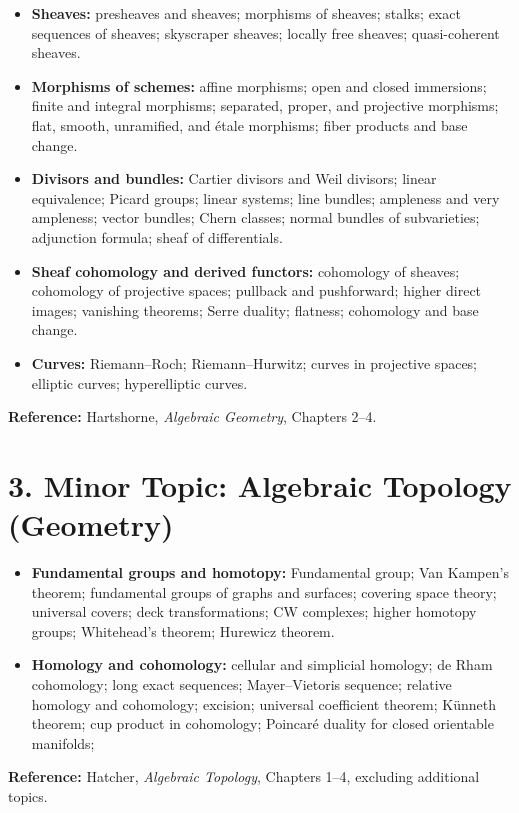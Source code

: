 \documentclass[11pt]{article}
\begin{document}
\begin{itemize}[leftmargin=2em]
    \item \textbf{Sheaves:} presheaves and sheaves; morphisms of sheaves; stalks; exact sequences of sheaves; skyscraper sheaves; locally free sheaves; quasi-coherent sheaves.
\item \textbf{Morphisms of schemes:} affine morphisms; open and closed immersions; finite and integral morphisms; separated, proper, and projective morphisms; flat, smooth, unramified, and \'{e}tale morphisms; fiber products and base change. 
    \item \textbf{Divisors and bundles:} Cartier divisors and Weil divisors; linear equivalence; Picard groups; linear systems; line bundles; ampleness and very ampleness; vector bundles; Chern classes; normal bundles of subvarieties; adjunction formula; sheaf of differentials.

    \item \textbf{Sheaf cohomology and derived functors:} cohomology of sheaves; cohomology of projective spaces; pullback and pushforward; higher direct images; vanishing theorems; Serre duality; flatness; cohomology and base change.

    \item \textbf{Curves:} Riemann--Roch; Riemann--Hurwitz; curves in projective spaces; elliptic curves; hyperelliptic curves.
\end{itemize}

\textbf{Reference:} Hartshorne, \emph{Algebraic Geometry}, Chapters 2--4.

\section*{3. Minor Topic: Algebraic Topology (Geometry)}

\begin{itemize}[leftmargin=2em]
    \item \textbf{Fundamental groups and homotopy:} Fundamental group; Van Kampen's theorem; fundamental groups of graphs and surfaces; covering space theory; universal covers; deck transformations; CW complexes; higher homotopy groups; Whitehead's theorem; Hurewicz theorem. 

    \item \textbf{Homology and cohomology:} cellular and simplicial homology; de Rham cohomology; long exact sequences; Mayer--Vietoris sequence; relative homology and cohomology; excision; universal coefficient theorem; K\"unneth theorem; cup product in cohomology; Poincar\'e duality for closed orientable manifolds; 
\end{itemize}

\textbf{Reference:} Hatcher, \emph{Algebraic Topology}, Chapters 1--4, excluding additional topics.
\end{document}
